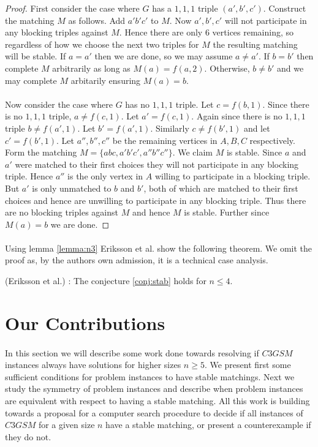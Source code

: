 \begin{definition}
\begin{lemma}
\end{lemma}
\begin{proof} First consider the case where $G$ has a $1,1,1$ triple $(a',b',c')$. Construct the matching $M$ as follows. Add $a'b'c'$ to $M$. Now $a',b',c'$ will not participate in any blocking triples against $M$. Hence there are only $6$ vertices remaining, so regardless of how we choose the next two triples for $M$ the resulting matching will be stable. If $a = a'$ then we are done, so we may assume $a\neq a'$. If $b = b'$ then complete $M$ arbitrarily as long as $M(a) = f(a,2)$. Otherwise, $b\neq b'$ and we may complete $M$ arbitarily ensuring $M(a) = b$.
\paragraph{} Now consider the case where $G$ has no $1,1,1$ triple. Let $c = f(b,1)$. Since there is no $1,1,1$ triple, $a \neq f(c,1)$. Let $a' = f(c,1)$. Again since there is no $1,1,1$ triple $b \neq f(a',1)$. Let $b' = f(a',1)$. Similarly $c \neq f(b',1)$ and let $c' = f(b',1)$. Let $a'', b'', c''$ be the remaining vertices in $A,B,C$ respectively. Form the matching $M = \{abc,a'b'c',a''b''c''\}$. We claim $M$ is stable. Since $a$ and $a'$ were matched to their first choices they will not participate in any blocking triple. Hence $a''$ is the only vertex in $A$ willing to participate in a blocking triple. But $a'$ is only unmatched to $b$ and $b'$, both of which are matched to their first choices and hence are unwilling to participate in any blocking triple. Thus there are no blocking triples against $M$ and hence $M$ is stable. Further since $M(a) = b$ we are done. 
\end{proof}
\paragraph{}
Using lemma \ref{lemma:n3} Eriksson et al. show the following theorem. We omit the proof as, by the authors own admission, it is a technical case analysis.
\begin{theorem}(Eriksson et al.) \label{theorem:n4} \cite{eriksson2006three}: The conjecture \ref{conj:stab} holds for $n\leq 4$.
\end{theorem}
\section{Our Contributions}
\paragraph{}
In this section we will describe some work done towards resolving if $C3GSM$ instances always have solutions for higher sizes $n\geq 5$. We present first some sufficient conditions for problem instances to have stable matchings. Next we study the symmetry of problem instances and describe when problem instances are equivalent with respect to having a stable matching. All this work is building towards a proposal for a computer search procedure to decide if all instances of $C3GSM$ for a given size $n$ have a stable matching, or present a counterexample if they do not.

\end{definition}
